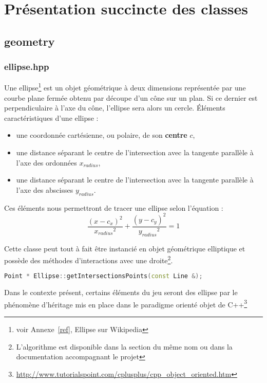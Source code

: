 \documentclass[a4paper,11pt]{report}
\begin{document}
\chapter[Les classes]{Présentation succincte des classes}
\section[Les objets géométriques]{geometry}

\subsection[Ellipse]{ellipse.hpp}
\begin{center}
\end{center}
Une ellipse\footnote{voir Annexe~\ref{ref}, Ellipse sur Wikipedia} est un objet 
géométrique à deux dimensions représentée par une courbe plane fermée obtenu par 
découpe d'un cône sur un plan. Si ce dernier est perpendiculaire à l'axe du 
cône, l'ellipse sera alors un cercle. Éléments caractéristiques d'une ellipse :
\begin{itemize}
	\item une coordonnée cartésienne, ou polaire, de son \textbf{centre} $c$,
	\item une distance séparant le centre de l'intersection avec la tangente
		parallèle à l'axe des ordonnées $x_{radius}$,
	\item une distance séparant le centre de l'intersection avec la tangente
		parallèle à l'axe des abscisses $y_{radius}$.
\end{itemize}
Ces éléments nous permettront de tracer une ellipse selon l'équation :
$$\frac{(x - c_x)^2}{{x_{radius}}^2} + \frac{(y - c_y)^2}{{y_{radius}}^2} = 1$$

Cette classe peut tout à fait être instancié en objet géométrique elliptique
et possède des méthodes d'interactions avec une droite\footnote{L'algorithme
	est disponible dans la section du même nom ou dans la documentation
accompagnant le projet}.
\begin{lstlisting}[frame=single,language=C++]
Point * Ellipse::getIntersectionsPoints(const Line &);
\end{lstlisting}
Dans le contexte présent, certains éléments du jeu seront des ellipse par le 
phénomène d'héritage mis en place dans le paradigme orienté objet de
C++\footnote{\url{http://www.tutorialspoint.com/cplusplus/cpp_object_oriented.htm}}
\end{document}
